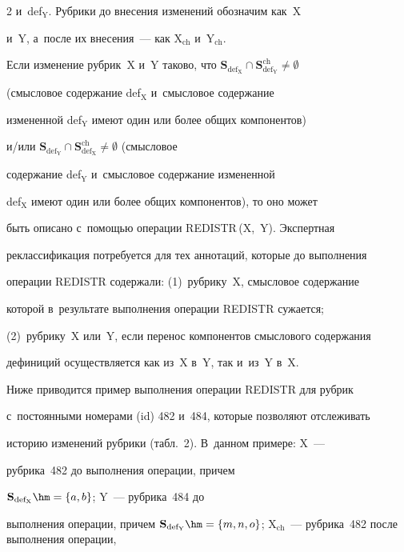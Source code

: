 \begin{multicols}{2}
и~def$_{\mathrm{Y}}$. Рубрики до внесения изменений обозначим как~X 


и~Y, а~после их внесения~--- как X$_{\mathrm{ch}}$ и~Y$_{\mathrm{ch}}$. 


Если изменение руб\-рик~X и~Y таково, что  $\mathbf{S}_{\mathrm{def_X}} 


\cap \mathbf{S}_{\mathrm{def_Y}}^{\mathrm{ch}}\not= \emptyset$ 


(смысловое содержание def$_{\mathrm{X}}$ и~смысловое содержание 


измененной def$_{\mathrm{Y}}$ имеют один или более общих компонентов) 


и/или $\mathbf{S}_{\mathrm{def_Y}} \cap 


\mathbf{S}_{\mathrm{def_X}}^{\mathrm{ch}}\not= \emptyset$ (смысловое 


содержание def$_{\mathrm{Y}}$ и~смысловое содержание измененной 


def$_{\mathrm{X}}$ имеют один или более общих компонентов), то оно может 


быть описано с~по\-мощью операции \mbox{REDISTR\,(X, Y)}. Экспертная 


реклассификация потребуется для тех аннотаций, которые до выполнения 


операции REDISTR содержали: (1)~руб\-ри\-ку~X, смысловое содержание 


которой в~результате выполнения операции REDISTR сужается;  


(2)~руб\-ри\-ку~X или~Y, если перенос компонентов смыслового содержания 


дефиниций осуществляется как из~X в~Y, так и~из~Y в~X.








Ниже приводится пример выполнения операции REDISTR для рубрик 


с~постоянными номерами (id) 482 и~484, которые позволяют отслеживать 


историю изменений рубрики (табл.~2). В~данном примере: X~---  


руб\-ри\-ка~482 до выполнения операции, причем 


$\mathbf{S}_{\mathrm{def_X}}\hm= \{a, b\}$; Y~--- руб\-ри\-ка~484 до 


выполнения операции, причем $\mathbf{S}_{\mathrm{def_Y}}\hm= 


\{m,n,o\}$; X$_{\mathrm{ch}}$~--- руб\-ри\-ка~482 после выполнения операции, 



\end{multicols}
